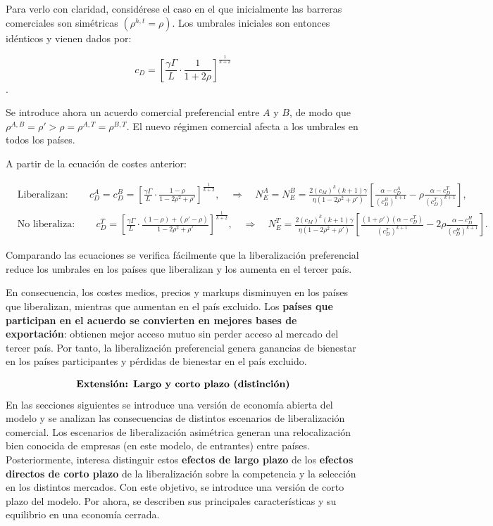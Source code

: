 \documentclass[10pt,a4paper]{article}
\begin{document}
Para verlo con claridad, considérese el caso en el que inicialmente las barreras comerciales son simétricas $(\rho^{h,t} = \rho)$. Los umbrales iniciales son entonces idénticos y vienen dados por:

$$c_D = \left[\frac{\gamma\Gamma}{L} \cdot \frac{1}{1 + 2\rho}\right]^{\frac{1}{k+2}}$$.

Se introduce ahora un acuerdo comercial preferencial entre $A$ y $B$, de modo que $\rho^{A,B} = \rho' > \rho = \rho^{A,T} = \rho^{B,T}$. El nuevo régimen comercial afecta a los umbrales en todos los países. 

A partir de la ecuación de costes anterior:

$$\begin{aligned}
    &\text{Liberalizan}:\qquad c_D^A = c_D^B = \left[\frac{\gamma\Gamma}{L}\cdot\frac{1 - \rho}{1 - 2\rho^2 + \rho'}\right]^{\frac{1}{k+2}},\quad \Longrightarrow\quad N_E^A = N_E^B =\frac{2(c_M)^k (k + 1)\gamma}{\eta (1 - 2\rho^2 + \rho')}\left[ \frac{\alpha - c_D^A}{(c_D^B)^{k+1}} - \rho \frac{\alpha - c_D^T}{(c_D^T)^{k+1}}\right],\\[1em]
    &\text{No liberaliza}:\qquad c_D^T = \left[\frac{\gamma\Gamma}{L} \cdot \frac{(1 - \rho) + (\rho' - \rho)}{1 - 2\rho^2 + \rho'} \right]^{\frac{1}{k+2}},\quad \Longrightarrow\quad N_E^T =\frac{2(c_M)^k (k + 1)\gamma}{\eta (1 - 2\rho^2 + \rho')}\left[\frac{(1 + \rho')(\alpha - c_D^T)}{(c_D^T)^{k+1}} - 2\rho \frac{\alpha - c_D^H}{(c_D^H)^{k+1}} \right].
\end{aligned}$$

Comparando las ecuaciones se verifica fácilmente que la liberalización preferencial reduce los umbrales en los países que liberalizan y los aumenta en el tercer país. 

En consecuencia, los costes medios, precios y markups disminuyen en los países que liberalizan, mientras que aumentan en el país excluido. Los \textbf{países que participan en el acuerdo se convierten en mejores bases de exportación}: obtienen mejor acceso mutuo sin perder acceso al mercado del tercer país. Por tanto, la liberalización preferencial genera ganancias de bienestar en los países participantes y pérdidas de bienestar en el país excluido.



$$\text{\textbf{Extensión: Largo y corto plazo (distinción)}}$$
En las secciones siguientes se introduce una versión de economía abierta del modelo y se analizan las consecuencias de distintos escenarios de liberalización comercial. Los escenarios de liberalización asimétrica generan una relocalización bien conocida de empresas (en este modelo, de entrantes) entre países. Posteriormente, interesa distinguir estos \textbf{efectos de largo plazo} de los \textbf{efectos directos de corto plazo} de la liberalización sobre la competencia y la selección en los distintos mercados. Con este objetivo, se introduce una versión de corto plazo del modelo. Por ahora, se describen sus principales características y su equilibrio en una economía cerrada.
\end{document}
